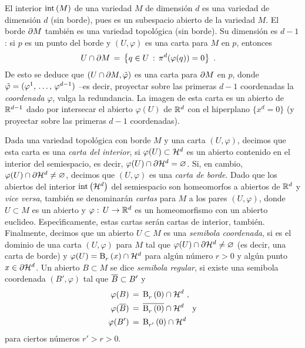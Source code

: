 El interior $\interior{M}$ de una variedad $M$ de dimensi\'{o}n $d$ es una
variedad de dimensi\'{o}n $d$ (sin borde), pues es un subespacio
abierto de la variedad $M$. El borde $\borde[M]$ tambi\'{e}n es una
variedad topol\'{o}gica (sin borde). Su dimensi\'{o}n es $d-1$: si $p$
es un punto del borde y $(U,\varphi)$ es una carta para $M$ en $p$,
entonces
\begin{align*}
	U\cap\borde[M] & \,=\,\left\lbrace q\in U\,:\,\pi^{d}(\varphi(q))=0
				\right\rbrace
	\text{ .}
\end{align*}
%
De esto se deduce que $(U\cap\borde[M],\tilde{\varphi})$ es una carta para
$\borde[M]$ en $p$, donde $\tilde{\varphi}=(\lista*{\varphi}{d-1})$ --es
decir, proyectar sobre las primeras $d-1$ coordenadas la \emph{coordenada}
$\varphi$, valga la redundancia. La imagen de esta carta es un abierto de
$\bb{R}^{d-1}$ dado por intersecar el abierto $\varphi(U)$ de $\bb{R}^{d}$
con el hiperplano $\{x^{d}=0\}$ (y proyectar sobre las primeras $d-1$
coordenadas).

Dada una variedad topol\'{o}gica con borde $M$ y  una carta $(U,\varphi)$,
decimos que esta carta es una \emph{carta del interior}, si
$\varphi(U)\subset\hemi[d]$ es un abierto contenido en el interior del
semiespacio, es decir, $\varphi(U)\cap\borde[{\hemi[d]}]=\varnothing$. Si,
en cambio, $\varphi(U)\cap\borde[{\hemi[d]}]\not=\varnothing$, decimos que
$(U,\varphi)$ es una \emph{carta de borde}. Dado que los abiertos del interior
$\interior{\hemi[d]}$ del semiespacio son homeomorfos a abiertos de
$\bb{R}^{d}$ y \textit{vice versa}, tambi\'{e}n se denominar\'{a}n
\emph{cartas} para $M$ a los pares $(U,\varphi)$, donde $U\subset M$ es un
abierto y $\varphi:\,U\rightarrow\bb{R}^{d}$ es un homeomorfismo con un
abierto euclideo. Espec\'{\i}ficamente, estas cartas ser\'{a}n cartas
de interior, tambi\'{e}n. Finalmente, decimos que un abierto $U\subset M$
es una \emph{semibola coordenada}, si es el dominio de una carta
$(U,\varphi)$ para $M$ tal que $\varphi(U)\cap\borde[{\hemi[d]}]\not=%
\varnothing$ (es decir, una carta de borde) y $\varphi(U)=%
\bola{r}{x}\cap\hemi[d]$ para alg\'{u}n n\'{u}mero $r>0$ y alg\'{u}n punto
$x\in\borde[{\hemi[d]}]$. Un abierto $B\subset M$ se dice
\emph{semibola regular}, si existe una semibola coordenada $(B',\varphi)$
tal que $\clos{B}\subset B'$ y
\begin{align*}
	\varphi(B) & \,=\,\bola{r}{0}\cap\hemi[d]\text{ ,}\\
	\varphi(\clos{B}) & \,=\,\clos{\bola{r}{0}}\cap\hemi[d]\quad\text{y} \\
	\varphi(B') & \,=\,\bola{r'}{0}\cap\hemi[d]
\end{align*}
%
para ciertos n\'{u}meros $r'>r>0$.

